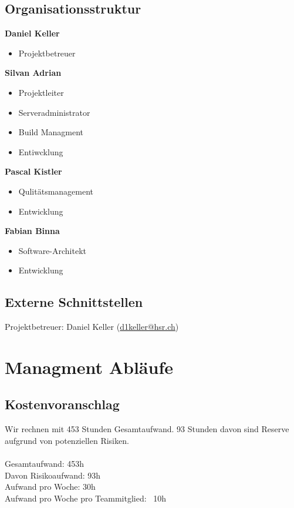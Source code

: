 \documentclass[11pt]{scrartcl}
\begin{document}
\subsection{Organisationsstruktur}
\label{sec:Organisationsstruktur}
\textbf{Daniel Keller}
\begin{itemize}
    \item Projektbetreuer
\end{itemize}
\textbf{Silvan Adrian}
\begin{itemize}
    \item Projektleiter
    \item Serveradministrator
    \item Build Managment
    \item Entiwcklung
\end{itemize}
\textbf{Pascal Kistler}
\begin{itemize}
    \item Qulitätsmanagement
    \item Entwicklung
\end{itemize}
\textbf{Fabian Binna}
\begin{itemize}
    \item Software-Architekt
    \item Entwicklung
\end{itemize}

\subsection{Externe Schnittstellen}
\label{sec:Externe Schnittstellen}
Projektbetreuer: Daniel Keller (\href{mailto:d1keller@hsr.ch}{d1keller@hsr.ch})

\section{Managment Abläufe}
\label{sec:Managment Abläufe}
\subsection{Kostenvoranschlag}
\label{sec:Kostenvoranschlag}
Wir rechnen mit 453 Stunden Gesamtaufwand. 93 Stunden davon sind Reserve aufgrund von potenziellen Risiken.\\
\\
Gesamtaufwand: 453h \\
Davon Risikoaufwand: 93h \\
Aufwand pro Woche: 30h \\
Aufwand pro Woche pro Teammitglied: ~10h \\
\end{document}
